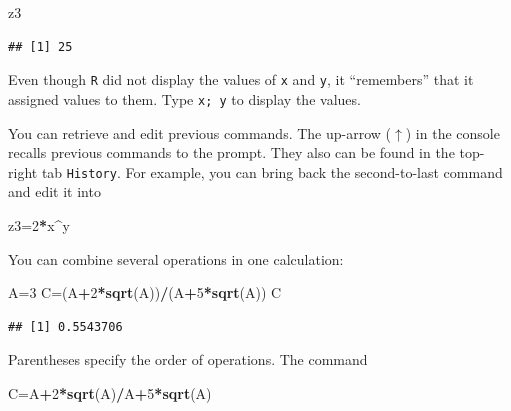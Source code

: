\documentclass[11pt,]{article}
\newenvironment{Shaded}{\begin{snugshade}}{\end{snugshade}}
\newcommand{\DecValTok}[1]{\textcolor[rgb]{0.00,0.00,0.81}{#1}}
\newcommand{\KeywordTok}[1]{\textcolor[rgb]{0.13,0.29,0.53}{\textbf{#1}}}
\newcommand{\NormalTok}[1]{#1}
\newcommand{\OperatorTok}[1]{\textcolor[rgb]{0.81,0.36,0.00}{\textbf{#1}}}
\begin{document}
\begin{Shaded}
\begin{Highlighting}[]
\NormalTok{z3}
\end{Highlighting}
\end{Shaded}

\begin{verbatim}
## [1] 25
\end{verbatim}

Even though \texttt{R} did not display the values of \texttt{x} and \texttt{y}, it ``remembers'' that it assigned values to them. Type \texttt{x;\ y} to display the values.

You can retrieve and edit previous commands. The up-arrow (\(\uparrow\)) in the console recalls previous commands to the prompt. They also can be found in the top-right tab \texttt{History}. For example, you can bring back the second-to-last command and edit it into

\begin{Shaded}
\begin{Highlighting}[]
\NormalTok{z3=}\DecValTok{2}\OperatorTok{*}\NormalTok{x}\OperatorTok{^}\NormalTok{y}
\end{Highlighting}
\end{Shaded}

You can combine several operations in one calculation:

\begin{Shaded}
\begin{Highlighting}[]
\NormalTok{A=}\DecValTok{3}
\NormalTok{C=(A}\OperatorTok{+}\DecValTok{2}\OperatorTok{*}\KeywordTok{sqrt}\NormalTok{(A))}\OperatorTok{/}\NormalTok{(A}\OperatorTok{+}\DecValTok{5}\OperatorTok{*}\KeywordTok{sqrt}\NormalTok{(A))}
\NormalTok{C}
\end{Highlighting}
\end{Shaded}

\begin{verbatim}
## [1] 0.5543706
\end{verbatim}

Parentheses specify the order of operations.
The command

\begin{Shaded}
\begin{Highlighting}[]
\NormalTok{C=A}\OperatorTok{+}\DecValTok{2}\OperatorTok{*}\KeywordTok{sqrt}\NormalTok{(A)}\OperatorTok{/}\NormalTok{A}\OperatorTok{+}\DecValTok{5}\OperatorTok{*}\KeywordTok{sqrt}\NormalTok{(A)}
\end{Highlighting}
\end{Shaded}
\end{document}
